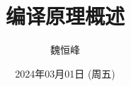 \documentclass[]{beamer}
\title[编译原理概述]{编译原理概述}
\author[魏恒峰]{\large 魏恒峰}
\institute{hfwei@nju.edu.cn}
\date{2024年03月01日 (周五)}
\begin{document}
\maketitle



\thankyou{}

\end{document}
